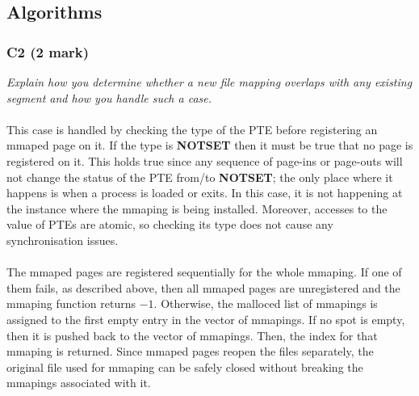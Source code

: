 \documentclass{report}
\newcommand{\question}[1]{\textit{#1} \ }
\newcommand{\const}[1]{\textcolor{BrickRed}{\textbf{#1}}}
\begin{document}
		\subsection*{Algorithms}
			\subsubsection*{C2 (2 mark)}
				\question{Explain how you determine whether a new file mapping overlaps 
				with any existing segment and how you handle such a case.}
				\\
				\\ This case is handled by checking the type of the PTE before registering an mmaped page on it.
				If the type is \const{NOTSET} then it must be true that no page is registered on it.
				This holds true since any sequence of page-ins or page-outs will not change the status of
				the PTE from/to \const{NOTSET}; the only place where it happens is when a process is loaded or exits.
				In this case, it is not happening at the instance where the mmaping is being installed. Moreover, accesses
				to the value of PTEs are atomic, so checking its type does not cause any synchronisation issues.
				\\
				\\ The mmaped pages are registered sequentially for the whole mmaping. If one of them fails, as described above, then
				all mmaped pages are unregistered and the mmaping function returns \const{$-1$}. Otherwise, the malloced list of mmapings
				is assigned to the first empty entry in the vector of mmapings. If no spot is empty, then it is pushed back to the vector of mmapings. Then, the
				index for that mmaping is returned. Since mmaped pages reopen the files separately, the original file used for mmaping can be safely closed
				without breaking the mmapings associated with it.
			
\end{document}
